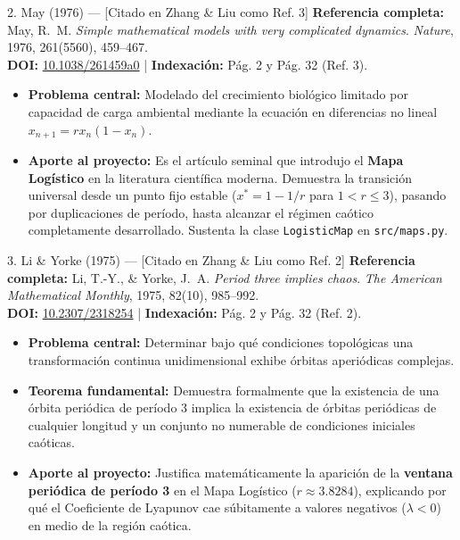 \documentclass[11pt,letterpaper]{article}
\begin{document}
\begin{paperbox}{2. May (1976) --- [Citado en Zhang \& Liu como Ref. 3]}
\textbf{Referencia completa:} May, R.~M. \textit{Simple mathematical models with very complicated dynamics}. \textit{Nature}, 1976, 261(5560), 459--467. \\
\textbf{DOI:} \href{https://doi.org/10.1038/261459a0}{10.1038/261459a0} \quad | \quad \textbf{Indexación:} Pág. 2 y Pág. 32 (Ref. 3).
\begin{itemize}
    \item \textbf{Problema central:} Modelado del crecimiento biológico limitado por capacidad de carga ambiental mediante la ecuación en diferencias no lineal $x_{n+1} = r x_n (1 - x_n)$.
    \item \textbf{Aporte al proyecto:} Es el artículo seminal que introdujo el \textbf{Mapa Logístico} en la literatura científica moderna. Demuestra la transición universal desde un punto fijo estable ($x^* = 1 - 1/r$ para $1 < r \le 3$), pasando por duplicaciones de período, hasta alcanzar el régimen caótico completamente desarrollado. Sustenta la clase \texttt{LogisticMap} en \texttt{src/maps.py}.
\end{itemize}
\end{paperbox}

\begin{paperbox}{3. Li \& Yorke (1975) --- [Citado en Zhang \& Liu como Ref. 2]}
\textbf{Referencia completa:} Li, T.-Y., \& Yorke, J.~A. \textit{Period three implies chaos}. \textit{The American Mathematical Monthly}, 1975, 82(10), 985--992. \\
\textbf{DOI:} \href{https://doi.org/10.2307/2318254}{10.2307/2318254} \quad | \quad \textbf{Indexación:} Pág. 2 y Pág. 32 (Ref. 2).
\begin{itemize}
    \item \textbf{Problema central:} Determinar bajo qué condiciones topológicas una transformación continua unidimensional exhibe órbitas aperiódicas complejas.
    \item \textbf{Teorema fundamental:} Demuestra formalmente que la existencia de una órbita periódica de período 3 implica la existencia de órbitas periódicas de cualquier longitud y un conjunto no numerable de condiciones iniciales caóticas.
    \item \textbf{Aporte al proyecto:} Justifica matemáticamente la aparición de la \textbf{ventana periódica de período 3} en el Mapa Logístico ($r \approx 3.8284$), explicando por qué el Coeficiente de Lyapunov cae súbitamente a valores negativos ($\lambda < 0$) en medio de la región caótica.
\end{itemize}
\end{paperbox}
\end{document}
